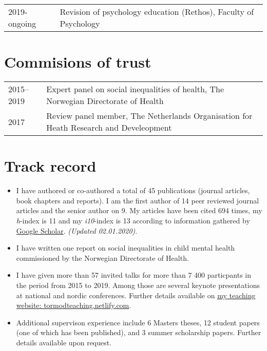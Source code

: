 \documentclass[11pt,a4paper,a4paper]{article}
\providecommand{\tightlist}{%
  \setlength{\itemsep}{0pt}\setlength{\parskip}{0pt}}
\newcounter{papers}
\begin{document}
\begin{tabular}{ll}
  2019-ongoing & Revision of psychology education (Rethos), Faculty of Psychology \\ 
  \end{tabular}

\hypertarget{commisions-of-trust}{%
\section{Commisions of trust}\label{commisions-of-trust}}

\begin{tabular}{ll}
  2015--2019 & Expert panel on social inequalities of health, The Norwegian Directorate of Health \\ 
  2017 & Review panel member, The Netherlands Organisation for Heath Research and Develeopment \\ 
  \end{tabular}

\hypertarget{track-record}{%
\section{Track record}\label{track-record}}

\begin{itemize}
\tightlist
\item
  I have authored or co-authored a total of 45 publications (journal articles, book chapters and reports). I am the first author of 14 peer reviewed journal articles and the senior author on 9. My articles have been cited 694 times, my \emph{h}-index is 11 and my \emph{i10}-index is 13 according to information gathered by \href{https://scholar.google.com/citations?user=TMC38ZgAAAAJ\&hl=en}{Google Scholar}. \emph{(Updated 02.01.2020)}.
\item
  I have written one report on social inequalities in child mental health commissioned by the Norwegian Directorate of Health.
\item
  I have given more than 57 invited talks for more than 7 400 particpants in the period from 2015 to 2019. Among those are several keynote presentations at national and nordic conferences. Further details available on \href{https://tormodteaching.netlify.com/appendd.html}{my teaching website: tormodteaching.netlify.com}.
\item
  Additional supervison experience include 6 Masters theses, 12 student papers (one of which has been published), and 3 summer scholarship papers. Further details available upon request.
\end{itemize}
\end{document}
